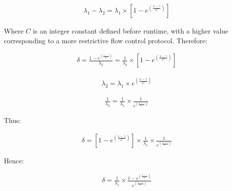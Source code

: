     \begin{equation}
		     \begin{aligned}
		         \lambda_1 - \lambda_2 = \lambda_1 \times [1 - e ^{ ({\frac{1-\gamma}{C}})}]
		     \end{aligned}
    \end{equation} 
    
    Where $C$ is an integer constant defined before runtime, with a higher value corresponding to a more restrictive flow control protocol.  
    Therefore:
    
    \begin{equation}
		     \begin{aligned}
		         \delta = \frac{1 - e ^{ ({\frac{1-\gamma}{C}})}}{\lambda_2} = \frac{1}{\lambda_2} \times [1 - e ^{ ({\frac{1-\gamma}{C}})}]
		     \end{aligned}
    \end{equation}
    
    \begin{equation}
		     \begin{aligned}
		         \lambda_2 = \lambda_1 \times e ^{ ({\frac{1-\gamma}{C}})}
		     \end{aligned}
    \end{equation}     
    
    \begin{equation}
		     \begin{aligned}
		         \frac{1}{\lambda_2} = \frac{1}{\lambda_1} \times \frac{1}{e ^{ ({\frac{1-\gamma}{C}})}}
		     \end{aligned}
    \end{equation}
    
    Thus:
    
     \begin{equation}
		     \begin{aligned}
		         \delta = [1 - e ^{ ({\frac{1-\gamma}{C}})}] \times \frac{1}{\lambda_1} \times \frac{1}{e ^{ ({\frac{1-\gamma}{C}})}}
		     \end{aligned}
    \end{equation}
    
    Hence:
    
        \begin{equation}
		     \begin{aligned}
		         \delta = \frac{1}{\lambda_1}  \times   \frac{1 - e ^{ ({\frac{1-\gamma}{C}})}}{e ^{ ({\frac{1-\gamma}{C}})}}
		     \end{aligned}
    \end{equation}
    
